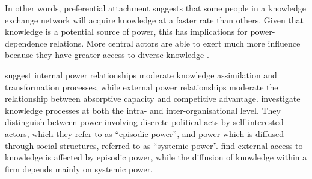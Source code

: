 In other words, preferential attachment suggests that some people in a knowledge exchange network will acquire knowledge at a faster rate than others. Given that knowledge is a potential source of power, this has implications for power-dependence relations. More central actors are able to exert much more influence because they have greater access to diverse knowledge \citep{emerson1962power,bonacich1987power}. 


\citet{todorova2007absorptive} suggest internal power relationships moderate knowledge assimilation and transformation processes, while external power relationships moderate the relationship between absorptive capacity and competitive advantage. \citet{easterby2008absorptive} investigate knowledge processes at both the intra- and inter-organisational level. They distinguish between power involving discrete political acts by self-interested actors, which they refer to as \enquote{episodic power}, and power which is diffused through social structures, referred to as \enquote{systemic power}. \citet{easterby2008absorptive} find external access to knowledge is affected by episodic power, while the diffusion of knowledge within a firm depends mainly on systemic power. \medskip



